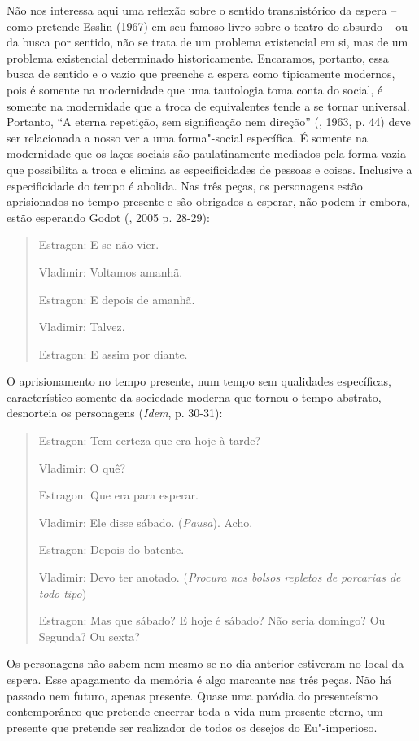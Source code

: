 Não nos interessa aqui uma reflexão sobre o sentido transhistórico da
espera -- como pretende Esslin (1967) em seu famoso livro sobre o teatro
do absurdo -- ou da busca por sentido, não se trata de um problema
existencial em si, mas de um problema existencial determinado
historicamente. Encaramos, portanto, essa busca de sentido e o vazio que
preenche a espera como tipicamente modernos, pois é somente na
modernidade que uma tautologia toma conta do social, é somente na
modernidade que a troca de equivalentes tende a se tornar universal.
Portanto, ``A eterna repetição, sem significação nem direção'' (,
1963, p. 44) deve ser relacionada a nosso ver a uma forma"-social
específica. É somente na modernidade que os laços sociais são
paulatinamente mediados pela forma vazia que possibilita a troca e
elimina as especificidades de pessoas e coisas. Inclusive a
especificidade do tempo é abolida. Nas três peças, os personagens estão
aprisionados no tempo presente e são obrigados a esperar, não podem ir
embora, estão esperando Godot (, 2005 p. 28-29):

\begin{quote}
Estragon: E se não vier.

Vladimir: Voltamos amanhã.

Estragon: E depois de amanhã.

Vladimir: Talvez.

Estragon: E assim por diante.
\end{quote}

O aprisionamento no tempo presente, num tempo sem qualidades
específicas, característico somente da sociedade moderna que tornou o
tempo abstrato, desnorteia os personagens (\emph{Idem}, p. 30-31):

\begin{quote}
Estragon: Tem certeza que era hoje à tarde?

Vladimir: O quê?

Estragon: Que era para esperar.

Vladimir: Ele disse sábado. (\emph{Pausa}). Acho.

Estragon: Depois do batente.

Vladimir: Devo ter anotado. (\emph{Procura nos bolsos repletos de
porcarias de todo tipo})

Estragon: Mas que sábado? E hoje é sábado? Não seria domingo? Ou
Segunda? Ou sexta?
\end{quote}

Os personagens não sabem nem mesmo se no dia anterior estiveram no local
da espera. Esse apagamento da memória é algo marcante nas três peças.
Não há passado nem futuro, apenas presente. Quase uma paródia do
presenteísmo contemporâneo que pretende encerrar toda a vida num
presente eterno, um presente que pretende ser realizador de todos os
desejos do Eu"-imperioso.

